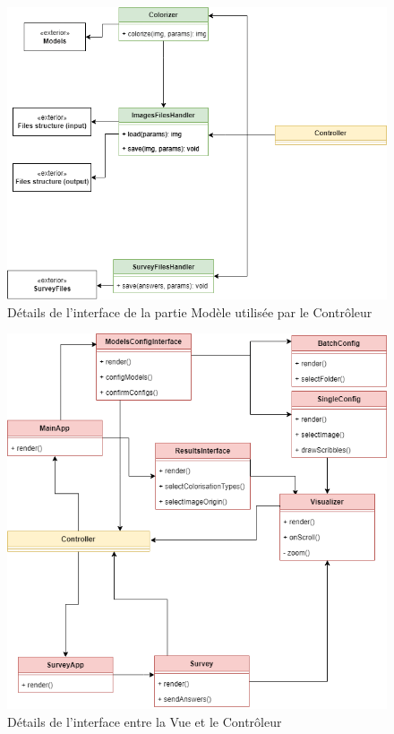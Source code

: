 \documentclass{article}
\begin{document}
\begin{figure}[!h]
    \centering
    \includegraphics[width=12cm]{code-architecture-model.png}
    \caption{Détails de l'interface de la partie Modèle utilisée par le Contrôleur}
    \label{fig:architecturemodel}
\end{figure}

\begin{figure}[!h]
    \centering
    \includegraphics[width=12cm]{code-architecture-view.png}
    \caption{Détails de l'interface entre la Vue et le Contrôleur}
    \label{fig:architectureview}
\end{figure}
\end{document}

